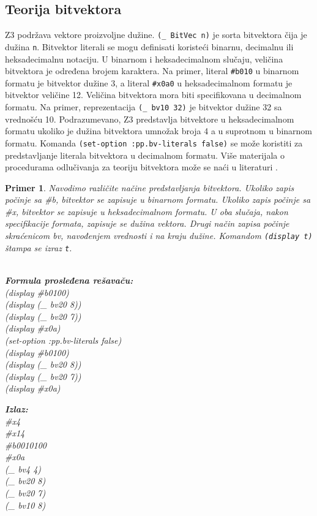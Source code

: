 \documentclass[12pt,oneside]{memoir}
\newtheorem{primer}{Primer}
\begin{document}
\subsection{Teorija bitvektora} 
Z3 podržava vektore proizvoljne dužine. \texttt{(\_ BitVec n)} je sorta bitvektora čija je dužina \texttt{n}. Bitvektor literali se mogu definisati koristeći binarnu, decimalnu ili heksadecimalnu notaciju. U binarnom i heksadecimalnom slučaju, veličina bitvektora je određena brojem karaktera. Na primer, literal \texttt{\#b010} u binarnom formatu je bitvektor dužine 3, a literal \texttt{\#x0a0} u heksadecimalnom formatu je bitvektor veličine 12. Veličina bitvektora mora biti specifikovana u decimalnom formatu. Na primer, reprezentacija \texttt{(\_ bv10 32)} je bitvektor dužine 32 sa vrednošću 10. Podrazumevano, Z3 predstavlja bitvektore u heksadecimalnom formatu ukoliko je dužina bitvektora umnožak broja 4 a u suprotnom u binarnom formatu. Komanda 
\texttt{(set-option :pp.bv-literals false)} se može koristiti za predstavljanje literala bitvektora u decimalnom formatu. Više materijala o procedurama odlučivanja za teoriju bitvektora može se naći u literaturi \cite{DPBitvector}.
\begin{primer} Navodimo različite načine predstavljanja bitvektora. Ukoliko zapis počinje sa \#b, bitvektor se zapisuje u binarnom formatu. Ukoliko zapis počinje sa \#x, bitvektor se zapisuje u heksadecimalnom formatu. U oba slučaja, nakon specifikacije formata, zapisuje se dužina vektora. Drugi način zapisa počinje skraćenicom bv, navođenjem vrednosti i na kraju dužine. Komandom \texttt{(display t)} štampa se izraz \texttt{t}.\\\\
\begin{minipage}[b]{0.45\textwidth}
\textbf{Formula prosleđena rešavaču:}
\\(display \#b0100)
\\(display (\_ bv20 8))
\\(display (\_ bv20 7))
\\(display \#x0a) 
\\(set-option :pp.bv-literals false)
\\(display \#b0100)
\\(display (\_ bv20 8))
\\(display (\_ bv20 7))
\\(display \#x0a)
\end{minipage}
\hspace{2.5cm}
\begin{minipage}[t]{0.4\textwidth}
\vspace{-5.9cm}
\textbf{Izlaz:}
\\\#x4 
\\\#x14 
\\\#b0010100 
\\\#x0a 
\\(\_ bv4 4) 
\\(\_ bv20 8) 
\\(\_ bv20 7) 
\\(\_ bv10 8)
\end{minipage}
\end{primer}
\end{document}
